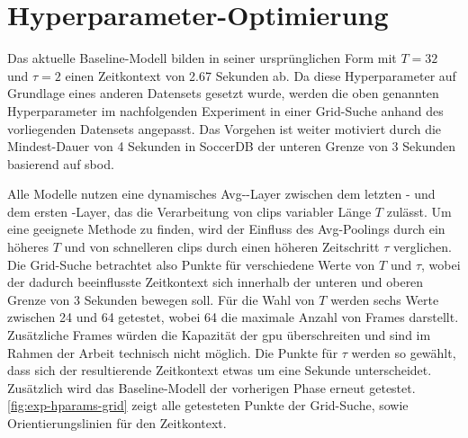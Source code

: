\section{Hyperparameter-Optimierung}
\label{sec:hyperparameter-optimierung}

Das aktuelle Baseline-Modell bilden in seiner ursprünglichen Form mit $T=32$ und $\tau = 2$ einen Zeitkontext von 2.67 Sekunden ab.
Da diese Hyperparameter auf Grundlage eines anderen Datensets gesetzt wurde, werden die oben genannten Hyperparameter im nachfolgenden Experiment in einer Grid-Suche anhand des vorliegenden Datensets angepasst.
Das Vorgehen ist weiter motiviert durch die Mindest-Dauer von 4 Sekunden in SoccerDB \bzw der unteren Grenze von 3 Sekunden basierend auf \gls{sbod}.

Alle Modelle nutzen eine dynamisches Avg-\pool-Layer zwischen dem letzten \conv- und dem ersten \fc-Layer, das die Verarbeitung von \glspl{clip} variabler Länge $T$ zulässt.
Um eine geeignete Methode zu finden, wird der Einfluss des Avg-Poolings durch ein höheres $T$ und von schnelleren \glspl{clip} durch einen höheren Zeitschritt $\tau$ verglichen.
Die Grid-Suche betrachtet also Punkte für verschiedene Werte von $T$ und $\tau$, wobei der dadurch beeinflusste Zeitkontext sich innerhalb der unteren und oberen Grenze von 3  Sekunden bewegen soll.
Für die Wahl von $T$ werden sechs Werte zwischen 24 und 64 getestet, wobei 64 die maximale Anzahl von Frames darstellt.
Zusätzliche Frames würden die Kapazität der \gls{gpu} überschreiten und sind im Rahmen der Arbeit technisch nicht möglich.
Die Punkte für $\tau$ werden so gewählt, dass sich der resultierende Zeitkontext etwas um eine Sekunde unterscheidet.
Zusätzlich wird das Baseline-Modell der vorherigen Phase erneut getestet.
\autoref{fig:exp-hparams-grid} zeigt alle getesteten Punkte der Grid-Suche, sowie Orientierungslinien für den Zeitkontext.

